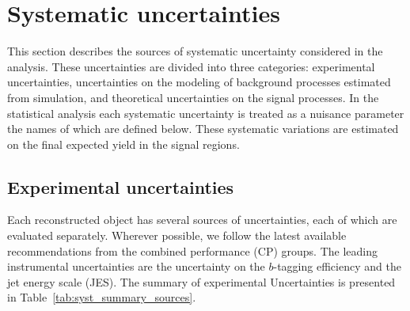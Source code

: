 \section{Systematic uncertainties}
\label{sec:dihiggs_syst}

This section describes the sources of systematic uncertainty
considered in the analysis. These uncertainties are divided into three
categories: experimental uncertainties, uncertainties on the modeling
of background processes estimated from simulation, and theoretical
uncertainties on the signal processes. In the statistical analysis
each systematic uncertainty is treated as a nuisance parameter the
names of which are defined below. These systematic variations are
estimated on the final expected yield in the signal regions.

\subsection{Experimental uncertainties}

Each reconstructed object has several sources of uncertainties, each
of which are evaluated separately. Wherever possible, we follow the
latest available recommendations from the combined performance (CP)
groups. The leading instrumental uncertainties are
the uncertainty on the $b$-tagging efficiency and the jet energy scale
(JES). The summary of experimental Uncertainties is presented in
Table~\ref{tab:syst_summary_sources}.
 
